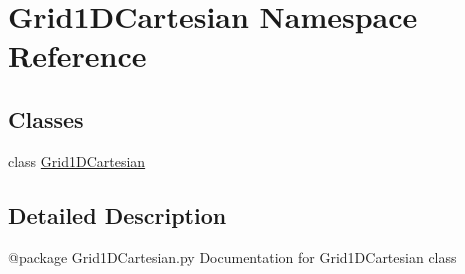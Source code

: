 \hypertarget{namespaceGrid1DCartesian}{\section{Grid1\-D\-Cartesian Namespace Reference}
\label{namespaceGrid1DCartesian}
}
\subsection*{Classes}
\begin{DoxyCompactItemize}
\item 
class \hyperlink{classGrid1DCartesian_1_1Grid1DCartesian}{Grid1\-D\-Cartesian}
\end{DoxyCompactItemize}


\subsection{Detailed Description}
\begin{DoxyVerb}@package Grid1DCartesian.py
Documentation for Grid1DCartesian class
\end{DoxyVerb}
 